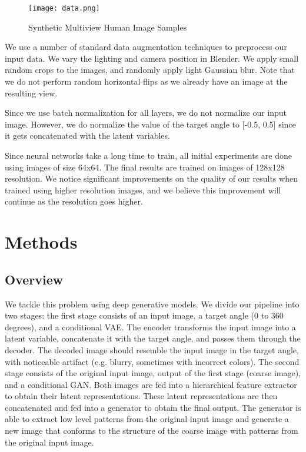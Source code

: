 \documentclass[10pt,conference]{IEEEtran}
\begin{document}
\begin{figure}[htbp]
\centering
\texttt{[image: data.png]}
\caption{Synthetic Multiview Human Image Samples}
\end{figure}

We use a number of standard data augmentation techniques to preprocess our input data. We vary the lighting and camera position in Blender. We apply small random crops to the images, and randomly apply light Gaussian blur. Note that we do not perform random horizontal flips as we already have an image at the resulting view.

Since we use batch normalization \autocite{ioffe2015batch} for all layers, we do not normalize our input image. However, we do normalize the value of the target angle to [-0.5, 0.5] since it gets concatenated with the latent variables.

Since neural networks take a long time to train, all initial experiments are done using images of size 64x64. The final results are trained on images of 128x128 resolution. We notice significant improvements on the quality of our results when trained using higher resolution images, and we believe this improvement will continue as the resolution goes higher.

\section{Methods}

\subsection{Overview}

We tackle this problem using deep generative models. We divide our pipeline into two stages: the first stage consists of an input image, a target angle (0 to 360 degrees), and a conditional VAE. The encoder transforms the input image into a latent variable, concatenate it with the target angle, and passes them through the decoder. The decoded image should resemble the input image in the target angle, with noticeable artifact (e.g. blurry, sometimes with incorrect colors). The second stage consists of the original input image, output of the first stage (coarse image), and a conditional GAN. Both images are fed into a hierarchical feature extractor to obtain their latent representations. These latent representations are then concatenated and fed into a generator to obtain the final output. The generator is able to extract low level patterns from the original input image and generate a new image that conforms to the structure of the coarse image with patterns from the original input image.
\end{document}
